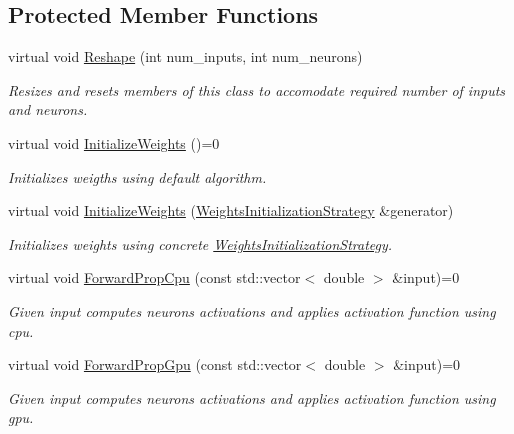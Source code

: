 \subsection*{Protected Member Functions}
\begin{DoxyCompactItemize}
\item 
virtual void \hyperlink{classneuralnet_1_1Layer_a6482cc828fd4b3e913b382b0141817c4}{Reshape} (int num\+\_\+inputs, int num\+\_\+neurons)
\begin{DoxyCompactList}\small\item\em Resizes and resets members of this class to accomodate required number of inputs and neurons. \end{DoxyCompactList}\item 
\mbox{\label{classneuralnet_1_1Layer_a32b8601861c0398fa4b4a8e20a80c9d2}} 
virtual void \hyperlink{classneuralnet_1_1Layer_a32b8601861c0398fa4b4a8e20a80c9d2}{Initialize\+Weights} ()=0
\begin{DoxyCompactList}\small\item\em Initializes weigths using default algorithm. \end{DoxyCompactList}\item 
virtual void \hyperlink{classneuralnet_1_1Layer_a5ab5c885d08bbf2e818a164e3875fc73}{Initialize\+Weights} (\hyperlink{classneuralnet_1_1WeightsInitializationStrategy}{Weights\+Initialization\+Strategy} \&generator)
\begin{DoxyCompactList}\small\item\em Initializes weights using concrete \hyperlink{classneuralnet_1_1WeightsInitializationStrategy}{Weights\+Initialization\+Strategy}. \end{DoxyCompactList}\item 
virtual void \hyperlink{classneuralnet_1_1Layer_a3aa08517de6a73640cd0e511c134b231}{Forward\+Prop\+Cpu} (const std\+::vector$<$ double $>$ \&input)=0
\begin{DoxyCompactList}\small\item\em Given input computes neurons\textquotesingle{} activations and applies activation function using cpu. \end{DoxyCompactList}\item 
virtual void \hyperlink{classneuralnet_1_1Layer_abd0fdf1146eb28485349337e68ad7982}{Forward\+Prop\+Gpu} (const std\+::vector$<$ double $>$ \&input)=0
\begin{DoxyCompactList}\small\item\em Given input computes neurons\textquotesingle{} activations and applies activation function using gpu. \end{DoxyCompactList}\item 

\end{DoxyCompactItemize}
